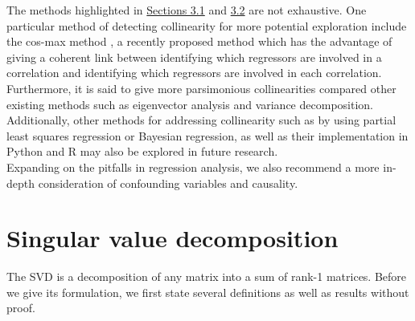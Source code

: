 \documentclass[12pt]{article}
\begin{document}
	The methods highlighted in \hyperref[sec:3.1]{Sections 3.1} and \hyperref[sec:3.2]{3.2} are not exhaustive. One particular method of detecting collinearity for more potential exploration include the cos-max method \cite{Shabuz2024}, a recently proposed method which has the advantage of giving a coherent link between identifying which regressors are involved in a correlation and identifying which regressors are involved in each correlation. Furthermore, it is said to give more parsimonious collinearities compared other existing methods such as eigenvector analysis and variance decomposition. Additionally, other methods for addressing collinearity such as by using partial least squares regression or Bayesian regression, as well as their implementation in Python and R may also be explored in future research. \\
	
	Expanding on the pitfalls in regression analysis, we also recommend a more in-depth consideration of confounding variables and causality. 
	
	\pagebreak
	
	\appendix %
	\section{\label{sec:svd}Singular value decomposition}
	The SVD is a decomposition of any matrix into a sum of rank-1 matrices. Before we give its formulation, we first state several definitions as well as results without proof.
\end{document}
